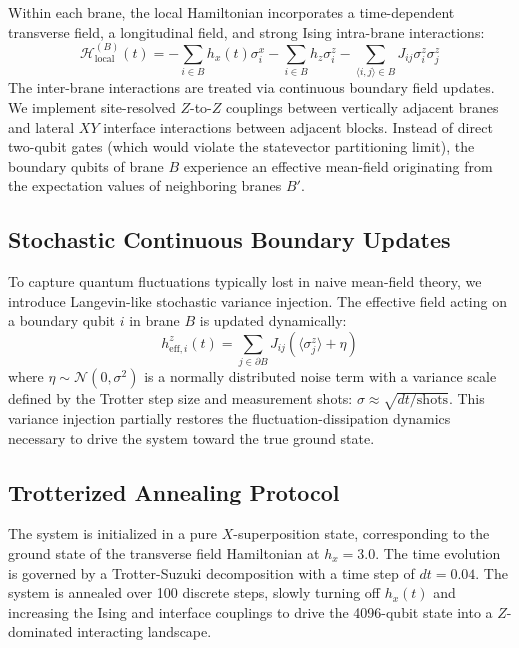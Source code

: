\documentclass[aps,pra,reprint,superscriptaddress,nofootinbib]{revtex4-2}
\begin{document}
Within each brane, the local Hamiltonian incorporates a time-dependent transverse field, a longitudinal field, and strong Ising intra-brane interactions:
\begin{equation}
\mathcal{H}_{\text{local}}^{(B)}(t) = - \sum_{i \in B} h_x(t) \sigma_i^x - \sum_{i \in B} h_z \sigma_i^z - \sum_{\langle i, j \rangle \in B} J_{ij} \sigma_i^z \sigma_j^z
\end{equation}
The inter-brane interactions are treated via continuous boundary field updates. We implement site-resolved $Z$-to-$Z$ couplings between vertically adjacent branes and lateral $XY$ interface interactions between adjacent blocks. Instead of direct two-qubit gates (which would violate the statevector partitioning limit), the boundary qubits of brane $B$ experience an effective mean-field originating from the expectation values of neighboring branes $B'$.

\subsection{Stochastic Continuous Boundary Updates}
To capture quantum fluctuations typically lost in naive mean-field theory, we introduce Langevin-like stochastic variance injection. The effective field acting on a boundary qubit $i$ in brane $B$ is updated dynamically:
\begin{equation}
h_{\text{eff}, i}^z(t) = \sum_{j \in \partial B} J_{ij} \left( \langle \sigma_j^z \rangle + \eta \right)
\end{equation}
where $\eta \sim \mathcal{N}(0, \sigma^2)$ is a normally distributed noise term with a variance scale defined by the Trotter step size and measurement shots: $\sigma \approx \sqrt{dt/\text{shots}}$. This variance injection partially restores the fluctuation-dissipation dynamics necessary to drive the system toward the true ground state.

\subsection{Trotterized Annealing Protocol}
The system is initialized in a pure $X$-superposition state, corresponding to the ground state of the transverse field Hamiltonian at $h_x = 3.0$. The time evolution is governed by a Trotter-Suzuki decomposition \cite{childs2021theory} with a time step of $dt = 0.04$. The system is annealed over 100 discrete steps, slowly turning off $h_x(t)$ and increasing the Ising and interface couplings to drive the 4096-qubit state into a $Z$-dominated interacting landscape. 
\end{document}
